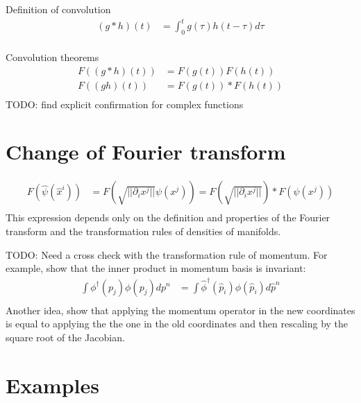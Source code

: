 \documentclass[11pt]{article}
\begin{document}
Definition of convolution
\begin{equation}
	\begin{aligned}
		(g * h)(t) &= \int_{0}^{t} g(\tau) h(t-\tau) d\tau\\
	\end{aligned}
\end{equation}

Convolution theorems
\begin{equation}
	\begin{aligned}
		F((g * h)(t)) &= F(g(t)) F(h(t))\\
		F((g h)(t)) &= F(g(t)) * F(h(t))\\
	\end{aligned}
\end{equation}
TODO: find explicit confirmation for complex functions

\section{Change of Fourier transform}
\begin{equation}
	\begin{aligned}
		F(\hat{\psi}(\hat{x}^i)) &= F\left(\sqrt{|| \partial_i x^j ||} \psi(x^j)\right) = F\left(\sqrt{|| \partial_i x^j ||}\right) * F \left( \psi(x^j)\right)  \\
	\end{aligned}
\end{equation}
This expression depends only on the definition and properties of the Fourier transform and the transformation rules of densities of manifolds.

TODO: Need a cross check with the transformation rule of momentum. For example, show that the inner product in momentum basis is invariant:
\begin{equation}
	\begin{aligned}
		\int \phi^\dagger(p_j) \phi(p_j) dp^n &= \int \hat{\phi}^\dagger(\hat{p}_i) \phi(\hat{p}_i) d\hat{p}^n  \\
	\end{aligned}
\end{equation}
Another idea, show that applying the momentum operator in the new coordinates is equal to applying the the one in the old coordinates and then rescaling by the square root of the Jacobian.

\section{Examples}
\end{document}

